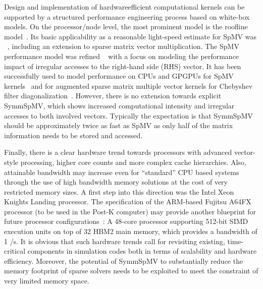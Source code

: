 	
Design and implementation of hardware\rAdd{-}efficient computational kernels can be
supported by a structured performance engineering process based on white-box
models. On the processor/node level, the most prominent model is the roof{}line
model~\cite{Williams_roofline}. Its basic applicability as a reasonable
light-speed estimate for \acrshort{SpMV} was   
~\cite{Gropp:1999}, including an extension to sparse matrix   vector
multiplication. The \acrshort{SpMV} performance model was refined
 ~\cite{Moritz_sell} with a focus on modeling the performance impact
of irregular accesses to the right-hand side (RHS) vector. It has been
successfully used to model performance on CPUs and GPGPUs for \acrshort{SpMV}
kernels~\cite{Moritz_sell} and for augmented sparse matrix multiple vector kernels
for Chebyshev filter diagonalization~\cite{ISC2018:ChebFD}. However, there is no
extension towards explicit \acrshort{SymmSpMV}, which shows increased
computational intensity and irregular accesses to both involved vectors. Typically the
expectation is that \acrshort{SymmSpMV} should be approximately twice as fast
as \acrshort{SpMV} as only half of the matrix information needs to be stored and
accessed.

Finally, there is a clear hardware trend towards processors with advanced
vector-style processing, higher core counts and more complex cache
hierarchies. Also, attainable bandwidth may increase even for ``standard'' CPU
based systems through the use of high bandwidth memory solutions at the cost of
very restricted memory sizes. A first step into this direction was the Intel
Xeon Knights Landing processor. The specification of the ARM-based Fujitsu
A64FX processor (to be used in the Post-K computer) may provide another
blueprint for future processor configurations~\cite{Post-K:Processor}: A 48-core
processor supporting 512-bit SIMD execution units on top of 32 \GiB HBM2 main
memory, which provides a bandwidth of 1 \TB/s.  It is obvious that such hardware
trends call for revisiting existing, time-critical components in simulation
codes both in terms of scalability and hardware efficiency. Moreover, the
potential of \acrshort{SymmSpMV} to substantially reduce the memory footprint of
sparse solvers needs to be exploited to meet the constraint of very limited
memory space.

